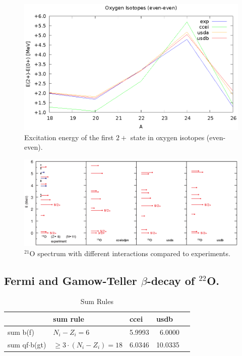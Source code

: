 \documentclass{llncs}
\begin{document}
\begin{figure}[h!]
\centering
\includegraphics[width=\textwidth]{2+_over_0+.eps}
\caption{Excitation energy of the first $2+$ state in oxygen isotopes (even-even).}
\end{figure}

\begin{figure}[h!]
\centering
\includegraphics[width=\textwidth]{21O.eps}
\caption{$^{21}$O spectrum with different interactions compared to experiments.}
\end{figure}

%
\subsection{Fermi and Gamow-Teller $\beta$-decay of $^{22}$O.}
%
\begin{table}
\caption{Sum Rules}
\begin{center}
\begin{tabular}{l@{\qquad}l@{\qquad}r@{\qquad}rl}
\hline
\multicolumn{1}{l}{\rule{0pt}{12pt}
                   }&\multicolumn{1}{l}{\rule{0pt}{12pt} sum rule}&\multicolumn{1}{l}{ccei}&\multicolumn{2}{l}{usdb}\\[2pt]
\hline\rule{0pt}{12pt}
sum b(f)            &  $N_i-Z_i=6$   & 5.9993 & 6.0000 &\\
sum qf$\cdot$b(gt)  &  $\ge 3\cdot(N_i-Z_i)=18$  & 6.0346 & 10.0335 &\\[2pt]
\hline
\end{tabular}
\end{center}
\end{table}
\end{document}
